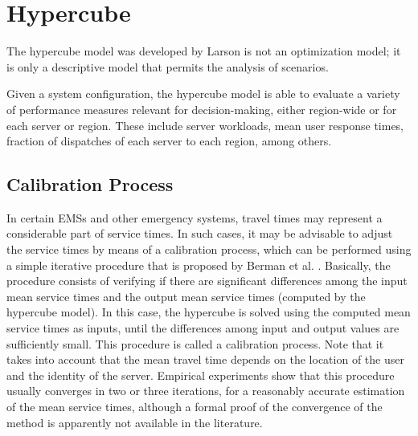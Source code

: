\section{Hypercube}
The hypercube model
was developed by Larson \cite{larson1974hypercube}
is not an optimization model; 
it is only a descriptive model
that permits the analysis of scenarios.

Given a system configuration,
the hypercube model
is able to evaluate
a variety of performance measures relevant for decision-making,
either region-wide or for each server or region. 
These include
server workloads,
mean user response times,
fraction of dispatches of each server to each region,
among others.

\subsection{Calibration Process}
In certain EMSs
and other emergency systems,
travel times may represent
a considerable part of service times.
In such cases,
it may be advisable
to adjust the service times
by means of a calibration process,
which can be performed
using a simple iterative procedure
that is proposed by Berman et al. \cite{berman1987stochastic}.
Basically,
the procedure consists of
verifying
if there are
significant differences among the input mean service times
and the output mean service times (computed by the hypercube model).
In this case,
the hypercube is solved
using the computed mean service times as inputs,
until
the differences
among input and output values
are sufficiently small.
This procedure is called
a calibration process.
Note that
it takes into account
that the mean travel time
depends on the location of the user
and the identity of the server.
Empirical experiments show
that this procedure
usually converges in two or three iterations,
for a reasonably accurate estimation of the mean service times,
although a formal proof of the convergence of the method
is apparently not available in the literature.
